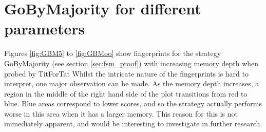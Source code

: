 \section{GoByMajority for different parameters}\label{sec:GBM}

Figures \ref{fig:GBM5} to \ref{fig:GBMoo} show fingerprints for the strategy GoByMajority (see section \ref{sec:fsm_proof}) with increasing memory depth when probed by TitForTat
Whilst the intricate nature of the fingerprints is hard to interpret, one major observation can be made.
As the memory depth increases, a region in the middle of the right hand side of the plot transitions from red to blue.
Blue areas correspond to lower scores, and so the strategy actually performs worse in this area when it has a larger memory.
This reason for this is not immediately apparent, and would be interesting to investigate in further research.

